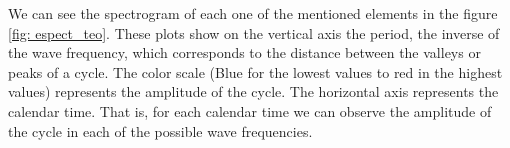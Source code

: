 \documentclass[a4paper]{article}
\begin{document}
	We can see the spectrogram of each one of the mentioned elements in the figure \ref{fig: espect_teo}. These plots show on the vertical axis the period, the inverse of the wave frequency, which corresponds to the distance between the valleys or peaks of a cycle. The color scale (Blue for the lowest values to red in the highest values) represents the amplitude of the cycle. The horizontal axis represents the calendar time. That is, for each calendar time we can observe the amplitude of the cycle in each of the possible wave frequencies.
	
	
	\begin{figure}[H]
		\centering
		\vspace{0.00mm}
		\vspace{0.00mm}
		\vspace{0.00mm}

\end{figure}
\end{document}
